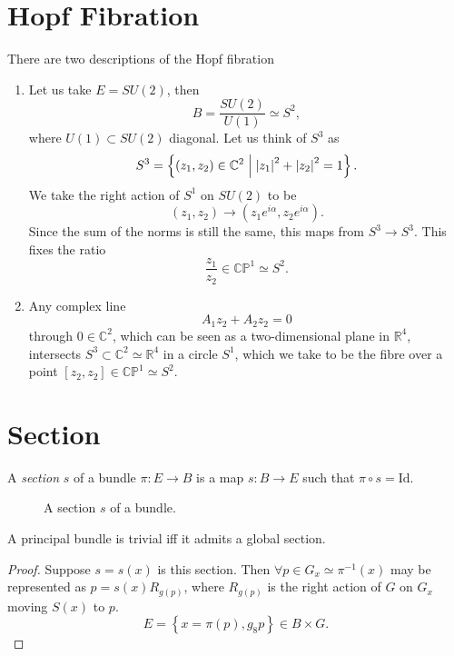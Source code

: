 \section{Hopf Fibration}%
\label{sec:hopf_fibration}

There are two descriptions of the Hopf fibration
\begin{enumerate}[1.]
  \item Let us take $E = SU(2)$, then
    \begin{equation}
      B = \frac{SU(2)}{U(1)} \simeq S^2,
    \end{equation}
    where $U(1) \subset SU(2)$ diagonal.
    Let us think of $S^3$ as
    \begin{equation}
      S^3 = \left\{ (z_1, z_2) \in \mathbb{C}^2 \suchthat \abs{z_1}^2 + \abs{z_2}^2 = 1 \right\}.
    \end{equation}
    We take the right action of $S^1$ on $SU(2)$ to be
    \begin{equation}
      (z_1, z_2) \to (z_1 e^{i \alpha}, z_2 e^{i \alpha}).
    \end{equation}
    Since the sum of the norms is still the same, this maps from $S^3 \to S^3$.
    This fixes the ratio
    \begin{equation}
      \frac{z_1}{z_2} \in \mathbb{C P}^1 \simeq S^2.
    \end{equation}
  \item Any complex line
    \begin{equation}
      A_1 z_2 + A_2 z_2 = 0
    \end{equation}
    through $0 \in \mathbb{C}^2$, which can be seen as a two-dimensional plane in $\mathbb{R}^4$, intersects $S^3 \subset \mathbb{C}^2 \simeq \mathbb{R}^4$ in a circle $S^1$, which we take to be the fibre over a point $[z_2, z_2] \in \mathbb{C P}^1 \simeq S^2$.
\end{enumerate}

\section{Section}%
\label{sec:section}

\begin{definition}[section]
  A \emph{section} $s$ of a bundle $\pi \colon E \to B$ is a map $s \colon B \to E$ such that $\pi \circ s = \text{Id}$.
\end{definition}
\begin{figure}[tbhp]
  \centering
  \caption{A section $s$ of a bundle.}
  \label{fig:l14f3}
\end{figure}

\begin{claim}
  A principal bundle is trivial iff it admits a global section.
\end{claim}
\begin{proof}
  Suppose $s = s(x)$ is this section.
  Then $\forall p \in G_x \simeq \pi^{-1}(x)$ may be represented as $p = s(x) R_{g(p)}$, where $R_{g(p)}$ is the right action of $G$ on $G_x$ moving $S(x)$ to $p$.
  \begin{equation}
    E = \left\{x = \pi(p), g_8p\right\} \in B \times G.
  \end{equation}
\end{proof}
